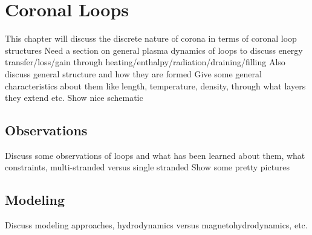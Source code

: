 \chapter{Coronal Loops}
\label{ch:coronal_loops}
This chapter will discuss the discrete nature of corona in terms of coronal loop structures
Need a section on general plasma dynamics of loops to discuss energy transfer/loss/gain through heating/enthalpy/radiation/draining/filling
Also discuss general structure and how they are formed
Give some general characteristics about them like length, temperature, density, through what layers they extend etc.
Show nice schematic
\section{Observations}
\label{sec:observations}
Discuss some observations of loops and what has been learned about them, what constraints, multi-stranded versus single stranded
Show some pretty pictures
\section{Modeling}
\label{sec:modeling}
Discuss modeling approaches, hydrodynamics versus magnetohydrodynamics, etc.
